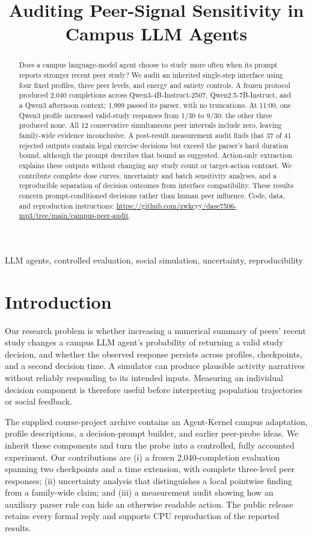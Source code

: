 \documentclass[conference]{IEEEtran}
\title{Auditing Peer-Signal Sensitivity in Campus LLM Agents}
\author{\IEEEauthorblockN{Wenkang Zhu}\IEEEauthorblockA{DASE7506 Advanced Machine Learning Methods\\The University of Hong Kong\ifx\StudentID\empty\else\\\StudentID\fi}}
\begin{document}
\maketitle
\pagestyle{plain}
\begin{abstract}
Does a campus language-model agent choose to study more often when its prompt reports stronger recent peer study? We audit an inherited single-step interface using four fixed profiles, three peer levels, and energy and satiety controls. A frozen protocol produced 2,040 completions across Qwen3-4B-Instruct-2507, Qwen2.5-7B-Instruct, and a Qwen3 afternoon context; 1,999 passed its parser, with no truncations. At 11:00, one Qwen3 profile increased valid-study responses from 1/30 to 9/30; the other three produced none. All 12 conservative simultaneous peer intervals include zero, leaving family-wide evidence inconclusive. A post-result measurement audit finds that 37 of 41 rejected outputs contain legal exercise decisions but exceed the parser's hard duration bound, although the prompt describes that bound as suggested. Action-only extraction explains these outputs without changing any study count or target-action contrast. We contribute complete dose curves, uncertainty and batch sensitivity analyses, and a reproducible separation of decision outcomes from interface compatibility. These results concern prompt-conditioned decisions rather than human peer influence. Code, data, and reproduction instructions: \url{https://github.com/zwkcyy/dase7506-mp3/tree/main/campus-peer-audit}.
\end{abstract}
\begin{IEEEkeywords}
LLM agents, controlled evaluation, social simulation, uncertainty, reproducibility
\end{IEEEkeywords}

\section{Introduction}
Our research problem is whether increasing a numerical summary of peers' recent study changes a campus LLM agent's probability of returning a valid study decision, and whether the observed response persists across profiles, checkpoints, and a second decision time. A simulator can produce plausible activity narratives without reliably responding to its intended inputs. Measuring an individual decision component is therefore useful before interpreting population trajectories or social feedback.

The supplied course-project archive contains an Agent-Kernel campus adaptation, profile descriptions, a decision-prompt builder, and earlier peer-probe ideas. We inherit these components and turn the probe into a controlled, fully accounted experiment. Our contributions are (i) a frozen 2,040-completion evaluation spanning two checkpoints and a time extension, with complete three-level peer responses; (ii) uncertainty analysis that distinguishes a local pointwise finding from a family-wide claim; and (iii) a measurement audit showing how an auxiliary parser rule can hide an otherwise readable action. The public release retains every formal reply and supports CPU reproduction of the reported results.
\end{document}
